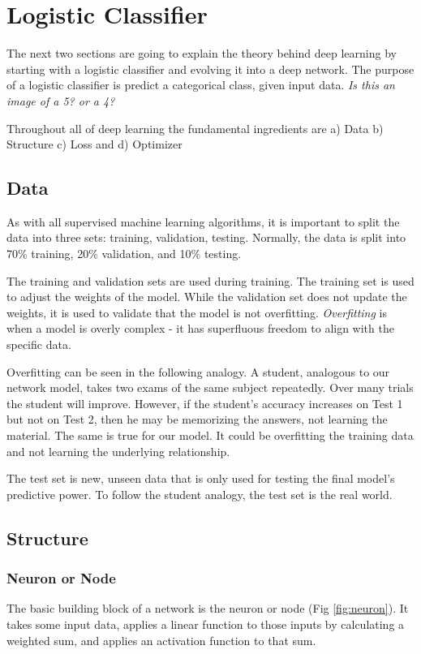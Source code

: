 \section{Logistic Classifier}
The next two sections are going to explain the theory behind deep learning by starting with a logistic classifier and evolving it into a deep network.  The purpose of a logistic classifier is predict a categorical class, given input data.  \textit{Is this an image of a 5? or a 4?}

Throughout all of deep learning the fundamental ingredients are a) Data b) Structure c) Loss and d) Optimizer

\subsection{Data}
As with all supervised machine learning algorithms, it is important to split the data into three sets: training, validation, testing.  Normally, the data is split into 70\% training, 20\% validation, and 10\% testing.  

The training and validation sets are used during training.  The training set is used to adjust the weights of the model.  While the validation set does not update the weights, it is used to validate that the model is not overfitting.  \emph{Overfitting} is when a model is overly complex - it has superfluous freedom to align with the specific data.    

Overfitting can be seen in the following analogy.  A student, analogous to our network model, takes two exams of the same subject repeatedly.  Over many trials the student will improve.  However, if the student's accuracy increases on Test 1 but not on Test 2, then he may be memorizing the answers, not learning the material.  The same is true for our model.  It could be overfitting the training data and not learning the underlying relationship.

The test set is new, unseen data that is only used for testing the final model's predictive power.  To follow the student analogy, the test set is the real world.  

\subsection{Structure}
\subsubsection{Neuron or Node}
The basic building block of a network is the neuron or node (Fig \ref{fig:neuron}).  It takes some input data, applies a linear function to those inputs by calculating a weighted sum, and applies an activation function to that sum.    


